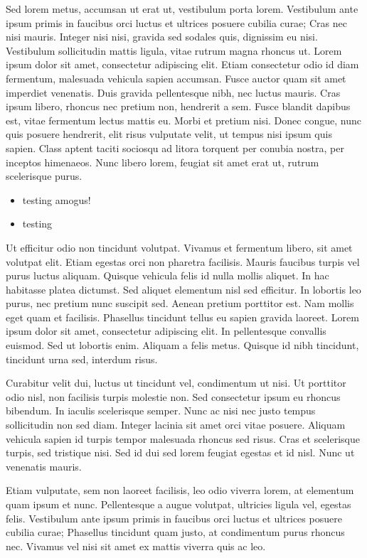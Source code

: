 \documentclass{article}
\begin{document}
\begin{multicols}{2}
        Sed lorem metus, accumsan ut erat ut, vestibulum porta lorem. Vestibulum ante ipsum primis in faucibus orci luctus et ultrices posuere cubilia curae; Cras nec nisi mauris. Integer nisi nisi, gravida sed sodales quis, dignissim eu nisi. Vestibulum sollicitudin mattis ligula, vitae rutrum magna rhoncus ut. Lorem ipsum dolor sit amet, consectetur adipiscing elit. Etiam consectetur odio id diam fermentum, malesuada vehicula sapien accumsan. Fusce auctor quam sit amet imperdiet venenatis. Duis gravida pellentesque nibh, nec luctus mauris. Cras ipsum libero, rhoncus nec pretium non, hendrerit a sem. Fusce blandit dapibus est, vitae fermentum lectus mattis eu. Morbi et pretium nisi. Donec congue, nunc quis posuere hendrerit, elit risus vulputate velit, ut tempus nisi ipsum quis sapien. Class aptent taciti sociosqu ad litora torquent per conubia nostra, per inceptos himenaeos. Nunc libero lorem, feugiat sit amet erat ut, rutrum scelerisque purus.

        \begin{itemize}
            \item testing
                amogus!
            \item testing
        \end{itemize}

        Ut efficitur odio non tincidunt volutpat. Vivamus et fermentum libero, sit amet volutpat elit. Etiam egestas orci non pharetra facilisis. Mauris faucibus turpis vel purus luctus aliquam. Quisque vehicula felis id nulla mollis aliquet. In hac habitasse platea dictumst. Sed aliquet elementum nisl sed efficitur. In lobortis leo purus, nec pretium nunc suscipit sed. Aenean pretium porttitor est. Nam mollis eget quam et facilisis. Phasellus tincidunt tellus eu sapien gravida laoreet. Lorem ipsum dolor sit amet, consectetur adipiscing elit. In pellentesque convallis euismod. Sed ut lobortis enim. Aliquam a felis metus. Quisque id nibh tincidunt, tincidunt urna sed, interdum risus.

        Curabitur velit dui, luctus ut tincidunt vel, condimentum ut nisi. Ut porttitor odio nisl, non facilisis turpis molestie non. Sed consectetur ipsum eu rhoncus bibendum. In iaculis scelerisque semper. Nunc ac nisi nec justo tempus sollicitudin non sed diam. Integer lacinia sit amet orci vitae posuere. Aliquam vehicula sapien id turpis tempor malesuada rhoncus sed risus. Cras et scelerisque turpis, sed tristique nisi. Sed id dui sed lorem feugiat egestas et id nisl. Nunc ut venenatis mauris.

        Etiam vulputate, sem non laoreet facilisis, leo odio viverra lorem, at elementum quam ipsum et nunc. Pellentesque a augue volutpat, ultricies ligula vel, egestas felis. Vestibulum ante ipsum primis in faucibus orci luctus et ultrices posuere cubilia curae; Phasellus tincidunt quam justo, at condimentum purus rhoncus nec. Vivamus vel nisi sit amet ex mattis viverra quis ac leo.
    \end{multicols}
\end{document}
